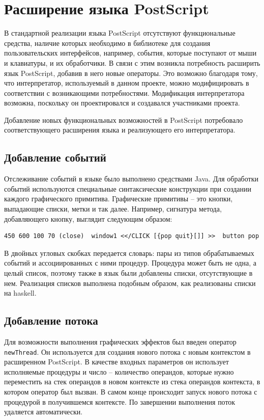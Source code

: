 

\section{Расширение языка PostScript}
В стандартной реализации языка PostScript отсутствуют функциональные средства, наличие которых необходимо в библиотеке для создания пользовательских интерфейсов, например, события, которые поступают от мыши и клавиатуры, и их обработчики. В связи с этим возникла потребность расширить язык PostScript, добавив в него новые операторы. Это возможно благодаря тому, что интерпретатор, используемый в данном проекте, можно модифицировать в соответствии с возникающими потребностями. Модификация интерпретатора возможна, поскольку он проектировался и создавался  участниками проекта.

Добавление новых функциональных возможностей в PostScript потребовало соответствующего расширения языка и реализующего его интерпретатора. 

\subsection{Добавление событий}
Отслеживание событий в языке было выполнено средствами Java. Для обработки событий используются специальные синтаксические конструкции при создании каждого графического примитива. Графические примитивы -- это кнопки, выпадающие списки, метки и так далее. Например, сигнатура метода, добавляющего кнопку, выглядит следующим образом:

\lstset{language=PostScript,basicstyle=\footnotesize\ttfamily} 
\begin{lstlisting}
450 600 100 70 (close)  window1 <</CLICK [{pop quit}[]] >>  button pop
\end{lstlisting}

В двойных угловых скобках передается словарь: пары из типов обрабатываемых событий и ассоциированных с ними процедур. Процедура может быть не одна, а целый список, поэтому также в язык были добавлены списки, отсутствующие в нем. Реализация списков выполнена подобным образом, как реализованы списки на haskell. 

\subsection{Добавление потока}
 Для возможности выполнения графических эффектов был введен оператор \texttt{newThread}. Он используется для создания нового потока с новым контекстом в расширенном PostScript. В качестве входных параметров он использует исполняемые процедуры и число -- количество операндов, которые нужно переместить на стек операндов в новом контексте из стека операндов контекста, в котором оператор был вызван. В самом конце происходит запуск нового потока с процедурой в получившемся контексте. По завершении выполнения поток удаляется автоматически.
 
